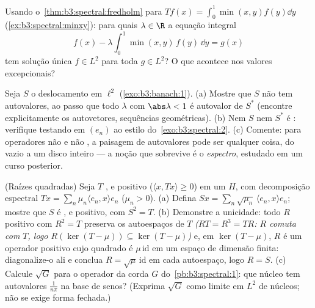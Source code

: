 \begin{exercise}[$\star\star$]\label{exo:b3:spectral:9}
Usando o~\cref{thm:b3:spectral:fredholm} para $Tf(x) =
\int_0^1\min(x,y)f(y)\dd y$ (\cref{ex:b3:spectral:minxy}): para quais $\lambda \in \R$ a
equação integral
\[
f(x) - \lambda\int_0^1\min(x,y)\,f(y)\,\dd y = g(x)
\]
tem solução única $f \in L^2$ para toda $g \in L^2$? O que acontece nos valores
excepcionais?
\end{exercise}

\begin{exercise}[$\star\star\star$]\label{exo:b3:spectral:10}
Seja $S$ o deslocamento em $\ell^2$ (\cref{exo:b3:banach:1}).
(a) Mostre que $S$ não tem autovalores, ao passo que todo $\lambda$ com
$\abs\lambda < 1$ é autovalor de $S^*$ (encontre explicitamente os autovetores,
sequências geométricas).
(b) Nem $S$ nem $S^*$ é : verifique testando em
$(e_n)$ ao estilo do~\cref{exo:b3:spectral:2}.
(c) Comente: para operadores não  e não , a
paisagem de autovalores pode ser qualquer coisa, do vazio a um disco
inteiro --- a noção que sobrevive é o \emph{espectro}, estudado em um
curso posterior.
\end{exercise}

\begin{exercise}[$\star\star$]\label{exo:b3:spectral:11}
(Raízes quadradas) Seja $T$ ,  e positivo ($\langle x, Tx\rangle \geq 0$)
em um  $H$, com decomposição espectral $Tx = \sum_n\mu_n\langle e_n,
x\rangle e_n$
($\mu_n > 0$).
(a) Defina $Sx = \sum_n\sqrt{\mu_n}\,\langle e_n, x\rangle
e_n$; mostre que $S$ é ,  e positivo,
com $S^2
= T$.
(b) Demonstre a unicidade: todo $R$  positivo 
com $R^2 = T$ preserva os autoespaços de $T$ \emph{($RT = R^3 = TR$: $R$ comuta
com $T$, logo $R(\ker(T - \mu)) \subseteq \ker(T - \mu)$)} e, em $\ker(T - \mu)$, $R$ é um operador positivo cujo
quadrado é $\mu\,\mathrm{id}$ em um espaço de dimensão finita: diagonalize-o ali e
conclua $R =
\sqrt\mu\,\mathrm{id}$ em cada autoespaço, logo $R = S$.
(c) Calcule $\sqrt G$ para o operador da corda $G$ do~\cref{pb:b3:spectral:1}: que
núcleo tem autovalores $\frac1{n\pi}$ na base de senos? (Exprima $\sqrt G$ como
limite em $L^2$ de núcleos; não se exige forma fechada.)
\end{exercise}

